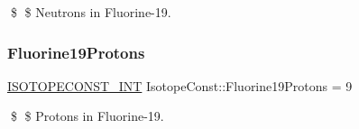 \$ \$ Neutrons in Fluorine-\/19. \mbox{\label{group___isotope_const-_fluorine-_f19_gad2ef9d69557f963db382fd103c3ef09e}} 
\subsubsection{\texorpdfstring{Fluorine19\+Protons}{Fluorine19Protons}}
{\footnotesize\ttfamily \mbox{\hyperlink{group___isotope_const-_macros_ga5f18360b3e99483a35c32d789e62621c}{I\+S\+O\+T\+O\+P\+E\+C\+O\+N\+S\+T\+\_\+\+I\+NT}} Isotope\+Const\+::\+Fluorine19\+Protons = 9}

\$ \$ Protons in Fluorine-\/19. 